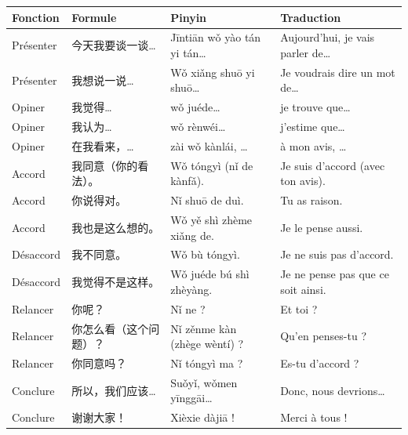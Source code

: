 \documentclass[11pt]{article}
\begin{document}
\begin{center}
\begin{tabularx}{\linewidth}{|X|X|X|X|}
\hline
\rowcolor{popblueL} Fonction & Formule & Pinyin & Traduction \\
\hline
Présenter & 今天我要谈一谈… & Jīntiān wǒ yào tán yi tán… & Aujourd'hui, je vais parler de… \\
\hline
Présenter & 我想说一说… & Wǒ xiǎng shuō yi shuō… & Je voudrais dire un mot de… \\
\hline
Opiner & 我觉得… & wǒ juéde… & je trouve que… \\
\hline
Opiner & 我认为… & wǒ rènwéi… & j'estime que… \\
\hline
Opiner & 在我看来，… & zài wǒ kànlái, … & à mon avis, … \\
\hline
Accord & 我同意（你的看法）。 & Wǒ tóngyì (nǐ de kànfǎ). & Je suis d'accord (avec ton avis). \\
\hline
Accord & 你说得对。 & Nǐ shuō de duì. & Tu as raison. \\
\hline
Accord & 我也是这么想的。 & Wǒ yě shì zhème xiǎng de. & Je le pense aussi. \\
\hline
Désaccord & 我不同意。 & Wǒ bù tóngyì. & Je ne suis pas d'accord. \\
\hline
Désaccord & 我觉得不是这样。 & Wǒ juéde bú shì zhèyàng. & Je ne pense pas que ce soit ainsi. \\
\hline
Relancer & 你呢？ & Nǐ ne ? & Et toi ? \\
\hline
Relancer & 你怎么看（这个问题）？ & Nǐ zěnme kàn (zhège wèntí) ? & Qu'en penses-tu ? \\
\hline
Relancer & 你同意吗？ & Nǐ tóngyì ma ? & Es-tu d'accord ? \\
\hline
Conclure & 所以，我们应该… & Suǒyǐ, wǒmen yīnggāi… & Donc, nous devrions… \\
\hline
Conclure & 谢谢大家！ & Xièxie dàjiā ! & Merci à tous ! \\
\hline
\end{tabularx}
\end{center}
\end{document}
